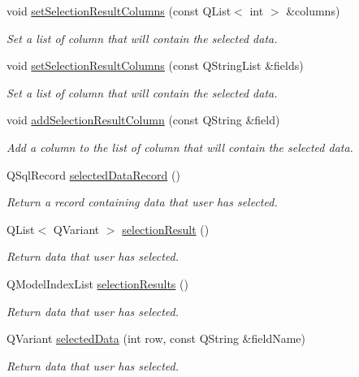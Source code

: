 \begin{DoxyCompactItemize}
void \hyperlink{classmdt_sql_selection_dialog_a88311778de191bf78e351ea4370b9a6d}{set\-Selection\-Result\-Columns} (const Q\-List$<$ int $>$ \&columns)
\begin{DoxyCompactList}\small\item\em Set a list of column that will contain the selected data. \end{DoxyCompactList}\item 
void \hyperlink{classmdt_sql_selection_dialog_a5c5c36414bf3c432979f53ad27f985cb}{set\-Selection\-Result\-Columns} (const Q\-String\-List \&fields)
\begin{DoxyCompactList}\small\item\em Set a list of column that will contain the selected data. \end{DoxyCompactList}\item 
void \hyperlink{classmdt_sql_selection_dialog_ae5582bd717078a137dd71d5a1b9cc9f9}{add\-Selection\-Result\-Column} (const Q\-String \&field)
\begin{DoxyCompactList}\small\item\em Add a column to the list of column that will contain the selected data. \end{DoxyCompactList}\item 
Q\-Sql\-Record \hyperlink{classmdt_sql_selection_dialog_affdf9a9936509c8b6ca141b8ff415995}{selected\-Data\-Record} ()
\begin{DoxyCompactList}\small\item\em Return a record containing data that user has selected. \end{DoxyCompactList}\item 
Q\-List$<$ Q\-Variant $>$ \hyperlink{classmdt_sql_selection_dialog_a23592c799f3b8945b3f5e72082dc265b}{selection\-Result} ()
\begin{DoxyCompactList}\small\item\em Return data that user has selected. \end{DoxyCompactList}\item 
Q\-Model\-Index\-List \hyperlink{classmdt_sql_selection_dialog_a85b7c1e3e156c141315d0873fa36d4b3}{selection\-Results} ()
\begin{DoxyCompactList}\small\item\em Return data that user has selected. \end{DoxyCompactList}\item 
Q\-Variant \hyperlink{classmdt_sql_selection_dialog_aab4943bc01e64f867791c15eea613e23}{selected\-Data} (int row, const Q\-String \&field\-Name)
\begin{DoxyCompactList}\small\item\em Return data that user has selected. \end{DoxyCompactList}\end{DoxyCompactItemize}
